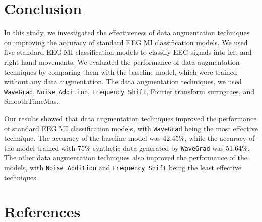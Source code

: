 \documentclass[12pt]{iopart}
\begin{document}
\section{Conclusion}
In this study, we investigated the effectiveness of data augmentation techniques on improving the accuracy of standard EEG MI classification models. We used five standard EEG MI classification models to classify EEG signals into left and right hand movements. We evaluated the performance of data augmentation techniques by comparing them with the baseline model, which were trained without any data augmentation. The data augmentation techniques, we used \texttt{WaveGrad}, \texttt{Noise Addition}, \texttt{Frequency Shift}, Fourier transform surrogates, and SmoothTimeMas.

Our results showed that data augmentation techniques improved the performance of standard EEG MI classification models, with \texttt{WaveGrad} being the most effective technique. The accuracy of the baseline model was 42.45\%, while the accuracy of the model trained with 75\% synthetic data generated by \texttt{WaveGrad} was 51.64\%. The other data augmentation techniques also improved the performance of the models, with \texttt{Noise Addition} and \texttt{Frequency Shift} being the least effective techniques.


\section{References}

% 
% 


\end{document}

